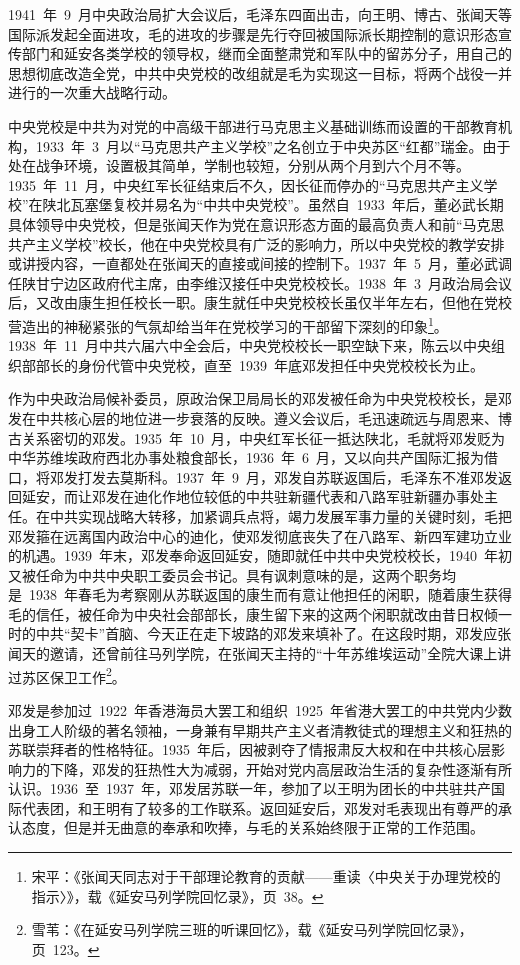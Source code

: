 1941~年~9~月中央政治局扩大会议后，毛泽东四面出击，向王明、博古、张闻天等国际派发起全面进攻，毛的进攻的步骤是先行夺回被国际派长期控制的意识形态宣传部门和延安各类学校的领导权，继而全面整肃党和军队中的留苏分子，用自己的思想彻底改造全党，中共中央党校的改组就是毛为实现这一目标，将两个战役一并进行的一次重大战略行动。

中央党校是中共为对党的中高级干部进行马克思主义基础训练而设置的干部教育机构，1933~年~3~月以“马克思共产主义学校”之名创立于中央苏区“红都”瑞金。由于处在战争环境，设置极其简单，学制也较短，分别从两个月到六个月不等。1935~年~11~月，中央红军长征结束后不久，因长征而停办的“马克思共产主义学校”在陕北瓦塞堡复校并易名为“中共中央党校”。虽然自~1933~年后，董必武长期具体领导中央党校，但是张闻天作为党在意识形态方面的最高负责人和前“马克思共产主义学校”校长，他在中央党校具有广泛的影响力，所以中央党校的教学安排或讲授内容，一直都处在张闻天的直接或间接的控制下。1937~年~5~月，董必武调任陕甘宁边区政府代主席，由李维汉接任中央党校校长。1938~年~3~月政治局会议后，又改由康生担任校长一职。康生就任中央党校校长虽仅半年左右，但他在党校营造出的神秘紧张的气氛却给当年在党校学习的干部留下深刻的印象\footnote{宋平：《张闻天同志对于干部理论教育的贡献——重读〈中央关于办理党校的指示〉》，载《延安马列学院回忆录》，页~38。}。1938~年~11~月中共六届六中全会后，中央党校校长一职空缺下来，陈云以中央组织部部长的身份代管中央党校，直至~1939~年底邓发担任中央党校校长为止。

作为中央政治局候补委员，原政治保卫局局长的邓发被任命为中央党校校长，是邓发在中共核心层的地位进一步衰落的反映。遵义会议后，毛迅速疏远与周恩来、博古关系密切的邓发。1935~年~10~月，中央红军长征一抵达陕北，毛就将邓发贬为中华苏维埃政府西北办事处粮食部长，1936~年~6~月，又以向共产国际汇报为借口，将邓发打发去莫斯科。1937~年~9~月，邓发自苏联返国后，毛泽东不准邓发返回延安，而让邓发在迪化作地位较低的中共驻新疆代表和八路军驻新疆办事处主任。在中共实现战略大转移，加紧调兵点将，竭力发展军事力量的关键时刻，毛把邓发箍在远离国内政治中心的迪化，使邓发彻底丧失了在八路军、新四军建功立业的机遇。1939~年末，邓发奉命返回延安，随即就任中共中央党校校长，1940~年初又被任命为中共中央职工委员会书记。具有讽刺意味的是，这两个职务均是~1938~年春毛为考察刚从苏联返国的康生而有意让他担任的闲职，随着康生获得毛的信任，被任命为中央社会部部长，康生留下来的这两个闲职就改由昔日权倾一时的中共“契卡”首脑、今天正在走下坡路的邓发来填补了。在这段时期，邓发应张闻天的邀请，还曾前往马列学院，在张闻天主持的“十年苏维埃运动”全院大课上讲过苏区保卫工作\footnote{雪苇：《在延安马列学院三班的听课回忆》，载《延安马列学院回忆录》，页~123。}。

邓发是参加过~1922~年香港海员大罢工和组织~1925~年省港大罢工的中共党内少数出身工人阶级的著名领袖，一身兼有早期共产主义者清教徒式的理想主义和狂热的苏联崇拜者的性格特征。1935~年后，因被剥夺了情报肃反大权和在中共核心层影响力的下降，邓发的狂热性大为减弱，开始对党内高层政治生活的复杂性逐渐有所认识。1936~至~1937~年，邓发居苏联一年，参加了以王明为团长的中共驻共产国际代表团，和王明有了较多的工作联系。返回延安后，邓发对毛表现出有尊严的承认态度，但是并无曲意的奉承和吹捧，与毛的关系始终限于正常的工作范围。

